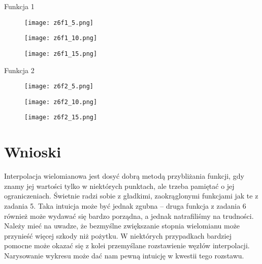 \documentclass[10pt]{article}
\begin{document}
\begin{center}
    \Huge{Funkcja 1}
\end{center}
\begin{figure}[H]
    \centering
    \texttt{[image: z6f1\_5.png]}
    \label{fig:enter-label}
\end{figure}
\begin{figure}[H]
    \centering
    \texttt{[image: z6f1\_10.png]}
    \label{fig:enter-label}
\end{figure}
\begin{figure}[H]
    \centering
    \texttt{[image: z6f1\_15.png]}
    \label{fig:enter-label}
\end{figure}
\begin{center}
    \Huge{Funkcja 2}
\end{center}
\begin{figure}[H]
    \centering
    \texttt{[image: z6f2\_5.png]}
    \label{fig:enter-label}
\end{figure}
\begin{figure}[H]
    \centering
    \texttt{[image: z6f2\_10.png]}
    \label{fig:enter-label}
\end{figure}
\begin{figure}[H]
    \centering
    \texttt{[image: z6f2\_15.png]}
    \label{fig:enter-label}
\end{figure}

\section{Wnioski}
Interpolacja wielomianowa jest dosyć dobrą metodą przybliżania funkcji, gdy znamy jej wartości tylko w niektórych punktach, ale trzeba pamiętać o jej ograniczeniach. Świetnie radzi sobie z gładkimi, zaokrąglonymi funkcjami jak te z zadania 5. Taka intuicja może być jednak zgubna – druga funkcja z zadania 6 również może wydawać się bardzo porządna, a jednak natrafiliśmy na trudności. Należy mieć na uwadze, że bezmyślne zwiększanie stopnia wielomianu może przynieść więcej szkody niż pożytku. W niektórych przypadkach bardziej pomocne może okazać się z kolei przemyślane rozstawienie węzłów interpolacji. Narysowanie wykresu może dać nam pewną intuicję w kwestii tego rozstawu.
\end{document}
